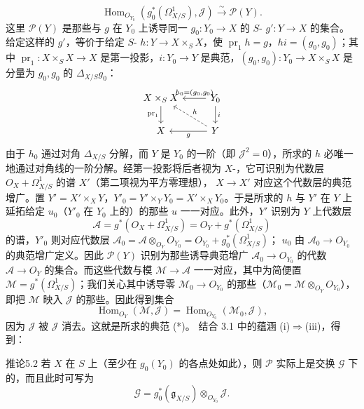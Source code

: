 \[\operatorname{Hom}_{O_{Y_0}}(g_0^*(\Omega^1_{X/S}),\mathcal J)\xrightarrow{\sim}\mathcal P(Y).\tag{*}\]
这里 $\mathcal P(Y)$ 是那些与 $g$ 在 $Y_0$ 上诱导同一 $g_0:Y_0\to X$ 的 $S$- $g':Y\to X$ 的集合。给定这样的 $g'$，等价于给定 $S$- $h:Y\to X\times_S X$，使 $\operatorname{pr}_1h=g$，$hi=(g_0,g_0)$；其中 $\operatorname{pr}_1:X\times_S X\to X$ 是第一投影，$i:Y_0\to Y$ 是典范，$(g_0,g_0):Y_0\to X\times_S X$ 是分量为 $g_0,g_0$ 的 $\Delta_{X/S}g_0$：
\[\begin{tikzcd}
X\times_S X\arrow[d,"\operatorname{pr}_1"']&Y_0\arrow[l,"{h_0=(g_0,g_0)}"']\arrow[d,"i"]\\
X&Y\arrow[l,"g"]\arrow[ul,dashed,"h"']
\end{tikzcd}\]
由于 $h_0$ 通过对角 $\Delta_{X/S}$ 分解，而 $Y$ 是 $Y_0$ 的一阶（即 $\mathcal J^2=0$），所求的 $h$ 必唯一地通过对角线的一阶分解。经第一投影将后者视为 $X$-，它可识别为代数层 $O_X+\Omega^1_{X/S}$ 的谱 $X'$（第二项视为平方零理想）， $X\to X'$ 对应这个代数层的典范增广。置 $Y'=X'\times_X Y$，$Y'_0=Y'\times_Y Y_0=X'\times_X Y_0$。于是所求的 $h$ 与 $Y'$ 在 $Y$ 上延拓给定 $u_0$（$Y'_0$ 在 $Y_0$ 上的）的那些 $u$ 一一对应。此外，$Y'$ 识别为 $Y$ 上代数层
\[\mathcal A=g^*(O_X+\Omega^1_{X/S})=O_Y+g^*(\Omega^1_{X/S})\]
的谱，$Y'_0$ 则对应代数层 $\mathcal A_0=\mathcal A\otimes_{O_Y}O_{Y_0}=O_{Y_0}+g_0^*(\Omega^1_{X/S})$； $u_0$ 由 $\mathcal A_0\to O_{Y_0}$ 的典范增广定义。因此 $\mathcal P(Y)$ 识别为那些诱导典范增广 $\mathcal A_0\to O_{Y_0}$ 的代数 $\mathcal A\to O_Y$ 的集合。而这些代数与模 $\mathcal M\to\mathcal A$ 一一对应，其中为简便置 $\mathcal M=g^*(\Omega^1_{X/S})$；我们关心其中诱导零 $\mathcal M_0\to O_{Y_0}$ 的那些（$\mathcal M_0=\mathcal M\otimes_{O_Y}O_{Y_0}$），即把 $\mathcal M$ 映入 $\mathcal J$ 的那些。因此得到集合
\[\operatorname{Hom}_{O_Y}(\mathcal M,\mathcal J)=\operatorname{Hom}_{O_{Y_0}}(\mathcal M_0,\mathcal J),\]
因为 $\mathcal J$ 被 $\mathcal J$ 消去。这就是所求的典范 (*)。
结合 3.1 中的蕴涵 (i)$\Rightarrow$(iii)，得到：
\begin{SGAresult}{推论}{5.2}
若 $X$ 在 $S$ 上（至少在 $g_0(Y_0)$ 的各点处如此），则 $\mathcal P$ 实际上是交换 $\mathcal G$ 下的，而且此时可写为
\[\mathcal G=g_0^*(\mathfrak g_{X/S})\otimes_{O_{Y_0}}\mathcal J.\]
\end{SGAresult}
